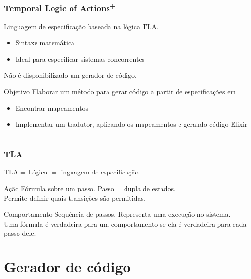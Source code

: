 \documentclass{beamer}
\begin{document}
\begin{frame}
  \frametitle{Temporal Logic of Actions\textsuperscript{+}}

  Linguagem de especificação baseada na lógica TLA.
  \begin{itemize}
    \item Sintaxe matemática
    \item Ideal para especificar sistemas concorrentes
  \end{itemize}\medskip

  Não é disponibilizado um gerador de código.\medskip\pause

  \begin{block}{Objetivo}
    Elaborar um método para gerar código a partir de especificações em \TLA
    \begin{itemize}
      \item Encontrar mapeamentos
      \item Implementar um tradutor, aplicando os mapeamentos e gerando código Elixir
    \end{itemize}
  \end{block}
\end{frame}

\section{\TLA}

\begin{frame}
  \frametitle{TLA}

  TLA = Lógica. \TLA = linguagem de especificação.\medskip

  \begin{block}{Ação}
    Fórmula sobre um passo. Passo = dupla de estados.\\\medskip
    Permite definir quais transições são permitidas.
  \end{block}

  \begin{block}{Comportamento}
    Sequência de passos. Representa uma execução no sistema.\\\medskip
    Uma fórmula é verdadeira para um comportamento se ela é verdadeira para cada passo dele.
  \end{block}

\end{frame}

\section{Gerador de código}
\end{document}
